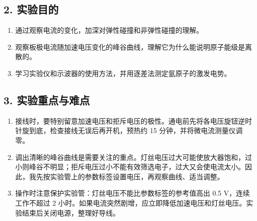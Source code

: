 \subsection*{2. 实验目的}

\begin{enumerate}
  \item 通过观察电流的变化，加深对弹性碰撞和非弹性碰撞的理解。
  \item 观察板极电流随加速电压变化的峰谷曲线，理解它为什么能说明原子能级是离散的。
  \item 学习实验仪和示波器的使用方法，并用逐差法测定氩原子的激发电势。
\end{enumerate}

\subsection*{3. 实验重点与难点}

\begin{enumerate}
  \item 接线时，要特别留意加速电压和拒斥电压的极性。通电前先将各电压旋钮逆时针旋到底，检查接线无误后再开机，预热约 15 分钟，并将微电流测量仪调零。
  \item 调出清晰的峰谷曲线是需要关注的重点。灯丝电压过大可能使放大器饱和，过小则峰谷不明显；拒斥电压过小不能有效筛选电子，过大又会使电流太小。因此，我先按实验管上的参数标签设置电压，再观察曲线、适当调整。
  \item 操作时注意保护实验管：灯丝电压不能比参数标签的参考值高出 0.5 V，连续工作不超过 2 小时。如果电流突然剧增，应立即降低加速电压和灯丝电压。实验结束后关闭电源，整理好导线。
\end{enumerate}
